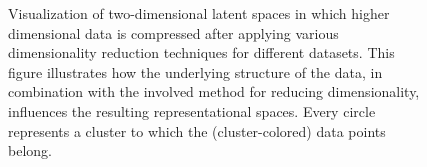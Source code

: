 \begin{figure}[H]
{      \begin{adjustbox}{clip,trim=0.34cm 0.22cm 0.275cm 0.01cm}
          \scalebox{0.17}{}
      \end{adjustbox}
      
      \begin{adjustbox}{clip,trim=0.34cm 0.22cm 0.275cm 0.01cm}
          \scalebox{0.17}{}
      \end{adjustbox}
      
      \begin{adjustbox}{clip,trim=0.34cm 0.22cm 0.275cm 0.01cm}
          \scalebox{0.17}{}
      \end{adjustbox}
      
      \begin{adjustbox}{clip,trim=0.34cm 0.22cm 0.275cm 0.01cm}
          \scalebox{0.17}{}
      \end{adjustbox}
      
      \begin{adjustbox}{clip,trim=0.34cm 0.22cm 0.275cm 0.01cm}
          \scalebox{0.17}{}
      \end{adjustbox}
    }
    
    \label{fig:latentspaces}
  \caption{Visualization of two-dimensional latent spaces in which higher dimensional data is compressed after applying various  dimensionality reduction techniques for different datasets. This figure illustrates how the underlying structure of the data, in combination with the involved method for reducing dimensionality, influences the resulting representational spaces. Every circle represents a cluster to which the (cluster-colored) data points belong.}
\end{figure}

